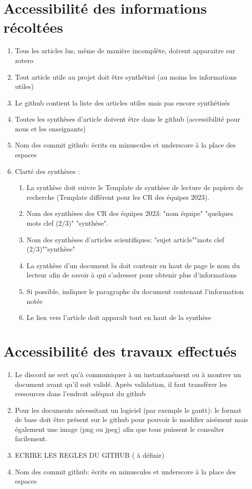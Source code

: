 \documentclass[11pt]{rapport_class}
\begin{document}
\section{Accessibilité des informations récoltées}
\begin{enumerate}
    \item Tous les articles lus, même de manière incomplète, doivent apparaitre sur zotero
    \item Tout article utile au projet doit être synthétisé (au moins les informations utiles)
    \item Le github contient la liste des articles utiles mais pas encore synthétisés
    \item Toutes les synthèses d'article doivent être dans le github (accessibilité pour nous et les enseignants)
    \item Nom des commit github: écrits en minuscules et underscore à la place des espaces
    \item Clarté des synthèses :
    \begin{enumerate}
        \item La synthèse doit suivre le Template de synthèse de lecture de papiers de recherche (Template différent pour les CR des équipes 2023).
        \item Nom des synthèses des CR des équipes 2023: "nom équipe" "quelques mots clef (2/3)" "synthèse".
        \item Nom des synthèses d'articles scientifiques: "sujet article""mots clef (2/3)""synthèse"
        \item La synthèse d'un document lu doit contenir en haut de page le nom du lecteur afin de savoir à qui s'adresser pour obtenir plus d'informations
        \item Si possible, indiquer le paragraphe du document contenant l'information notée
        \item Le lien vers l'article doit apparaît tout en haut de la synthèse
    \end{enumerate}
\end{enumerate}

\section{Accessibilité des travaux effectués}
\begin{enumerate}
    \item Le discord ne sert qu'à communiquer à un instantanément ou à montrer un document avant qu'il soit validé. Après validation, il faut transférer les ressources dans l'endroit adéquat du github
    \item Pour les documents nécessitant un logiciel (par exemple le gantt): le format de base doit être présent sur le github pour pouvoir le modifier aisément mais également une image (png ou jpeg) afin que tous puissent le consulter facilement.
    \item ECRIRE LES REGLES DU GITHUB ( à définir)
    \item Nom des commit github: écrits en minuscules et underscore à la place des espaces
\end{enumerate}
\end{document}
